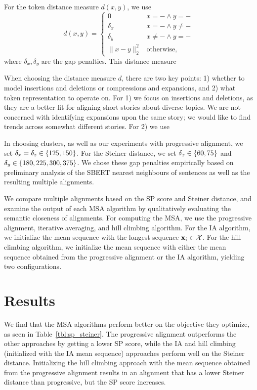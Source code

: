 \documentclass{article}
\begin{document}
For the token distance measure $d(x, y)$,
we use
\begin{equation} 
d(x,y) = \begin{cases}
0 & x=- \wedge y=-\\
\delta_x & x=- \wedge y\ne- \\
\delta_y & x\ne- \wedge y = -\\
\|x-y\|_2^2 & \mathrm{otherwise,}
\end{cases}
\end{equation}
where $\delta_x,\delta_y$ are the gap penalties.
This distance measure

When choosing the distance measure $d$, there are two key points:
1) whether to model insertions and deletions or compressions and expansions,
and 2) what token representation to operate on.
For 1) we focus on insertions and deletions, as they are a better fit for aligning
short stories about diverse topics. We are not concerned with identifying 
expansions upon the same story; we would like to find trends across somewhat
different stories.
For 2) we use 

In choosing clusters, as well as our experiments with progressive alignment,
we set $\delta_x=\delta_z \in \left\{125, 150\right\}$.
For the Steiner distance, we set $\delta_x \in \left\{60, 75\right\}$
and $\delta_y \in \left\{180, 225, 300, 375\right\}$.
We chose these gap penalties empirically based on preliminary analysis of the SBERT
nearest neighbours of sentences as well as the resulting multiple alignments.

We compare multiple alignments based on the SP score and Steiner distance,
and examine the output of each MSA algorithm by qualitatively evaluating the 
semantic closeness of alignments.
For computing the MSA, we use the progressive alignment, iterative averaging,
and hill climbing algorithm.
For the IA algorithm, we initialize the mean sequence with the longest sequence $\mathbf{x}_i \in \mathcal{X}$.
For the hill climbing algorithm, we initialize the mean sequence with
either the mean sequence obtained from the progressive alignment or the IA algorithm,
yielding two configurations.

\section{Results}
We find that the MSA algorithms perform better on the objective they optimize,
as seen in Table~\ref{tbl:sp_steiner}.
The progressive alignment outperforms the other approaches by getting a lower SP score,
while the IA and hill climbing (initialized with the IA mean sequence)
approaches perform well on the Steiner distance.
Initializing the hill climbing approach with the mean sequence obtained from 
the progressive alignment results in an alignment that has a lower Steiner distance
than progressive, but the SP score increases.
\end{document}
